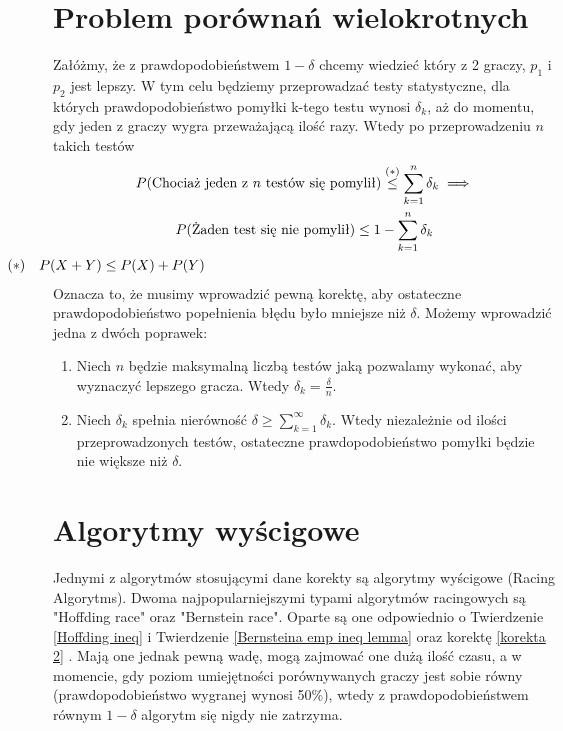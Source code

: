 \documentclass[inzynierska]{pwr_wmat_praca_dyplomowa}
\theoremstyle{plain}
\numberwithin{theorem}{chapter}
\theoremstyle{definition}
\numberwithin{theorem}{chapter}
\begin{document}
	\section{Problem porównań wielokrotnych}
	Załóżmy, że z prawdopodobieństwem $1-\delta$ chcemy wiedzieć który z 2 graczy, $p_1$ i $p_2$ jest lepszy. W tym
	celu będziemy przeprowadzać testy statystyczne, dla których
	prawdopodobieństwo pomyłki k-tego testu wynosi $\delta_k$, aż do momentu, gdy jeden z graczy wygra przeważającą ilość razy. Wtedy po przeprowadzeniu $n$ takich testów
	\begin{gather*}
		P(\text{Chociaż jeden z $n$ testów się pomylił}) \overset{(*)}{\le} \sum_{k=1}^n \delta_k \implies  \\
	P(\text{Żaden test się nie pomylił}) \le 1 - \sum_{k=1}^n \delta_k \\
	\hspace*{-10cm} (*) \quad P(X+Y) \le P(X) + P(Y) 
	\end{gather*} 
	Oznacza to, że musimy wprowadzić pewną korektę, aby
	ostateczne prawdopodobieństwo popełnienia błędu było
	mniejsze niż $\delta$.
	Możemy wprowadzić jedna z dwóch poprawek:

	\begin{enumerate}[label=\thesection.\arabic*]
		\item \label{korekta 1} Niech $n$ będzie maksymalną liczbą testów jaką pozwalamy wykonać, aby wyznaczyć lepszego
		gracza. Wtedy $\delta_k=\frac{\delta}{n}$.
		\item \label{korekta 2} Niech $\delta_k$ spełnia nierówność $ \delta \ge \displaystyle\sum_{k = 1}^{\infty}\delta_k$. Wtedy niezależnie od
		ilości przeprowadzonych testów, ostateczne
		prawdopodobieństwo pomyłki będzie nie większe niż
		$\delta$.
	\end{enumerate}

	\section{Algorytmy wyścigowe}
	Jednymi z algorytmów stosującymi dane korekty są algorytmy wyścigowe
	(Racing \\Algorytms). Dwoma najpopularniejszymi typami algorytmów racingowych są "Hoffding race" oraz "Bernstein race".
	Oparte są one odpowiednio o Twierdzenie \ref{Hoffding ineq} i Twierdzenie \ref{Bernsteina emp ineq lemma} oraz korektę \ref{korekta 2} . Mają one jednak pewną wadę, mogą zajmować one dużą ilość czasu, a w momencie, gdy poziom umiejętności porównywanych graczy jest sobie równy (prawdopodobieństwo wygranej wynosi 50\%), wtedy z prawdopodobieństwem równym $1-\delta$ algorytm się nigdy nie zatrzyma.
	
\end{document}
